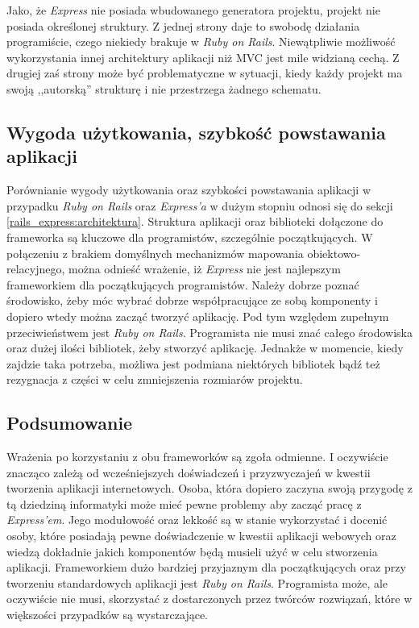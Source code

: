 Jako, że \textit{Express} nie posiada wbudowanego generatora projektu, projekt nie posiada określonej struktury. Z jednej strony daje to swobodę działania programiście, czego niekiedy brakuje w \textit{Ruby on Rails}. Niewątpliwie możliwość wykorzystania innej architektury aplikacji niż MVC jest mile widzianą cechą. Z drugiej zaś strony może być problematyczne w sytuacji, kiedy każdy projekt ma swoją ,,autorską'' strukturę i nie przestrzega żadnego schematu.

\subsection{Wygoda użytkowania, szybkość powstawania aplikacji}
Porównianie wygody użytkowania oraz szybkości powstawania aplikacji w przypadku \textit{Ruby on Rails} oraz \textit{Express'a} w dużym stopniu odnosi się do sekcji \ref{rails_express:architektura}. Struktura aplikacji oraz biblioteki dołączone do frameworka są kluczowe dla programistów, szczególnie początkujących. W połączeniu z brakiem domyślnych mechanizmów mapowania obiektowo-relacyjnego, można odnieść wrażenie, iż \textit{Express} nie jest najlepszym frameworkiem dla początkujących programistów. Należy dobrze poznać środowisko, żeby móc wybrać dobrze współpracujące ze sobą komponenty i dopiero wtedy można zacząć tworzyć aplikację. Pod tym względem zupełnym przeciwieństwem jest \textit{Ruby on Rails}. Programista nie musi znać całego środowiska oraz dużej ilości bibliotek, żeby stworzyć aplikację. Jednakże w momencie, kiedy zajdzie taka potrzeba, możliwa jest podmiana niektórych bibliotek bądź też rezygnacja z części w celu zmniejszenia rozmiarów projektu.

\subsection{Podsumowanie}
Wrażenia po korzystaniu z obu frameworków są zgoła odmienne. I oczywiście znacząco zależą od wcześniejszych doświadczeń i przyzwyczajeń w kwestii tworzenia aplikacji internetowych. Osoba, która dopiero zaczyna swoją przygodę z tą dziedziną informatyki może mieć pewne problemy aby zacząć pracę z \textit{Express'em}. Jego modułowość oraz lekkość są w stanie wykorzystać i docenić osoby, które posiadają pewne doświadczenie w kwestii aplikacji webowych oraz wiedzą dokładnie jakich komponentów będą musieli użyć w celu stworzenia aplikacji. Frameworkiem dużo bardziej przyjaznym dla początkujących oraz przy tworzeniu standardowych aplikacji jest \textit{Ruby on Rails}. Programista może, ale oczywiście nie musi, skorzystać z dostarczonych przez twórców rozwiązań, które w większości przypadków są wystarczające.


